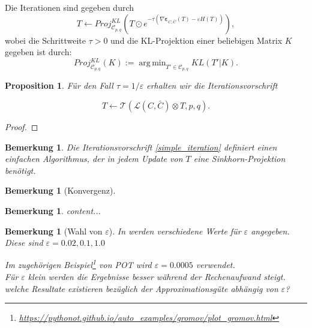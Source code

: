 \documentclass[twoside, 11pt,a4paper]{article}
\DeclareMathOperator*{\argmin}{arg\,min}
\newtheorem{proposition}[theorem]{Proposition}
\newtheorem{remark}[theorem]{Bemerkung}
\numberwithin{equation}{section}
\begin{document}
	Die Iterationen sind gegeben durch
	\begin{equation}
		T \leftarrow Proj_{\mathcal{C}_{p,q}}^{KL} \left(T \odot e^{-\tau( \nabla \boldsymbol{\varepsilon}_{C, \bar{C}}(T) -\varepsilon H(T))} \right),
	\end{equation}
	wobei die Schrittweite $\tau > 0$ und die KL-Projektion einer beliebigen Matrix $K$ gegeben ist durch:
	\begin{equation}
		Proj_{\mathcal{C}_{p,q}}^{KL}(K) := \argmin_{T' \in \mathcal{C}_{p,q}} KL(T'|K).
	\end{equation}
	
	\begin{proposition}
		Für den Fall $\tau= 1/\varepsilon$ erhalten wir die Iterationsvorschrift
		
		\begin{equation}
			T \leftarrow \mathcal{T}(\mathcal{L} (C, \bar{C}) \otimes T,p,q). \label{simple_iteration}
		\end{equation}
	\end{proposition}
	
	\begin{proof}
	\end{proof}

\begin{remark}
	Die Iterationsvorschrift \ref{simple_iteration} definiert einen einfachen Algorithmus, der in jedem Update von $T$ eine Sinkhorn-Projektion benötigt.
\end{remark}

\begin{remark}[Konvergenz]

\end{remark}
		
	

\begin{remark}
	content...
\end{remark}

\begin{remark}[Wahl von $\varepsilon$]
	 In \cite{cuturi2013sinkhorn} werden verschiedene Werte für $\varepsilon$ angegeben. Diese sind $\varepsilon = 0.02, 0.1, 1.0$
	 
	 Im zugehörigen Beispiel\footnote{\url{https://pythonot.github.io/auto_examples/gromov/plot_gromov.html}} von POT wird $\varepsilon = 0.0005$ verwendet. \\
	 Für $\varepsilon$ klein werden die Ergebnisse besser während der Rechenaufwand steigt.\\
	 welche Resultate existieren bezüglich der Approximationsgüte abhängig von $\varepsilon$?
\end{remark}
\end{document}
